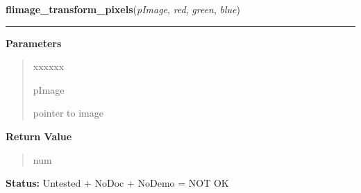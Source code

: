 \hspace{.8\funcindent}\begin{boxedminipage}{\funcwidth}

    \raggedright \textbf{flimage\_transform\_pixels}(\textit{pImage}, \textit{red}, \textit{green}, \textit{blue})

    \vspace{-1.5ex}

    \rule{\textwidth}{0.5\fboxrule}
\setlength{\parskip}{2ex}
\setlength{\parskip}{1ex}
      \textbf{Parameters}
      \vspace{-1ex}

      \begin{quote}
        \begin{Ventry}{xxxxxx}

          \item[pImage]

          pointer to image

        \end{Ventry}

      \end{quote}

      \textbf{Return Value}
    \vspace{-1ex}

      \begin{quote}
      num

      \end{quote}

\textbf{Status:} Untested + NoDoc + NoDemo = NOT OK



    \end{boxedminipage}

    \label{xformslib:flflimage:flimage_windowlevel}

    \vspace{0.5ex}

